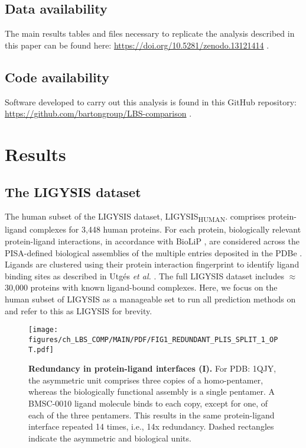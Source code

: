\subsection{Data availability}

The main results tables and files necessary to replicate the analysis described in this paper can be found here: \url{https://doi.org/10.5281/zenodo.13121414} \cite{UTGES_2024_LBSCOMP_ZENODO}.

\subsection{Code availability}

Software developed to carry out this analysis is found in this GitHub repository: \url{https://github.com/bartongroup/LBS-comparison} \cite{UTGES_2024_LBSCOMP_REPO}.

\section{Results}

\subsection{The LIGYSIS dataset}

The human subset of the LIGYSIS dataset, LIGYSIS\textsubscript{HUMAN}. comprises protein-ligand complexes for 3,448 human proteins. For each protein, biologically relevant protein-ligand interactions, in accordance with BioLiP \cite{YANG_2013_BIOLIP}, are considered across the PISA-defined \cite{KRISSINEL_2007_PISA} biological assemblies of the multiple entries deposited in the PDBe \cite{ARMSTRONG_2020_PDBE}. Ligands are clustered using their protein interaction fingerprint to identify ligand binding sites as described in Utgés \textit{et al.} \cite{UTGES_2024_FRAGSYS, UTGES_2024_FRAGSYS_ZENODO}. The full LIGYSIS dataset includes $\approx$30,000 proteins with known ligand-bound complexes. Here, we focus on the human subset of LIGYSIS as a manageable set to run all prediction methods on and refer to this as LIGYSIS for brevity.

\begin{figure}[htb!]
    \centering
    \texttt{[image: figures/ch\_LBS\_COMP/MAIN/PDF/FIG1\_REDUNDANT\_PLIS\_SPLIT\_1\_OPT.pdf]}
    \caption[Redundancy in protein-ligand interfaces (I)]{\textbf{Redundancy in protein-ligand interfaces (I).} For PDB: 1QJY, the asymmetric unit comprises three copies of a homo-pentamer, whereas the biologically functional assembly is a single pentamer. A BMSC-0010 ligand molecule binds to each copy, except for one, of each of the three pentamers. This results in the same protein-ligand interface repeated 14 times, i.e., 14x redundancy. Dashed rectangles indicate the asymmetric and biological units.}
    \label{fig:redundant_plis_1}
\end{figure}

